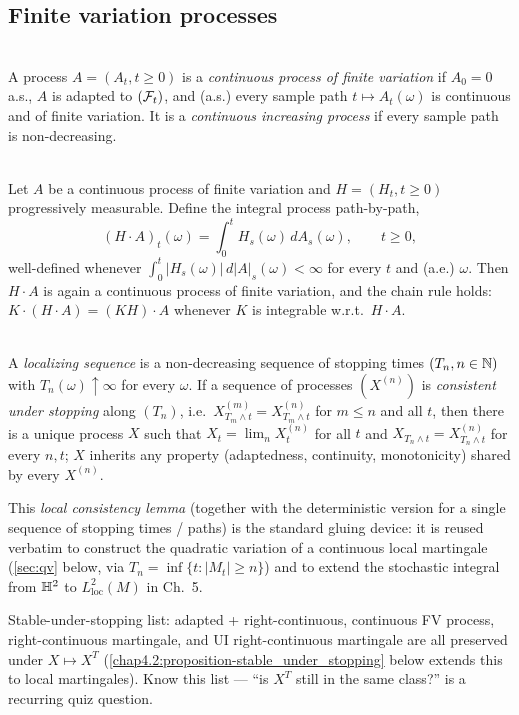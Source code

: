 \subsection{Finite variation processes}
\begin{definition} \label{chap4.1:definition-continuous_fv_process}  \\
A process $A=(A_t,t\ge0)$ is a \textit{continuous process of finite variation} if $A_0=0$ a.s., $A$ is adapted to $(\mathcal{F}_t)$, and (a.s.) every sample path $t\mapsto A_t(\omega)$ is continuous and of finite variation. It is a \textit{continuous increasing process} if every sample path is non-decreasing.
\end{definition}

\begin{proposition} \label{chap4.1:proposition-integral_process}  \\
Let $A$ be a continuous process of finite variation and $H=(H_t,t\ge0)$ progressively measurable. Define the integral process path-by-path,
$$(H\cdot A)_t(\omega)=\int_0^t H_s(\omega)\,dA_s(\omega), \qquad t\ge0,$$
well-defined whenever $\int_0^t|H_s(\omega)|\,d|A|_s(\omega)<\infty$ for every $t$ and (a.e.) $\omega$. Then $H\cdot A$ is again a continuous process of finite variation, and the chain rule holds: $K\cdot(H\cdot A)=(KH)\cdot A$ whenever $K$ is integrable w.r.t.\ $H\cdot A$.
\end{proposition}

\begin{definition} \label{chap4.1:definition-localizing_sequence}  \\
A \textit{localizing sequence} is a non-decreasing sequence of stopping times $(T_n,n\in\mathbb{N})$ with $T_n(\omega)\uparrow\infty$ for every $\omega$. If a sequence of processes $(X^{(n)})$ is \textit{consistent under stopping} along $(T_n)$, i.e.\ $X^{(m)}_{T_m\wedge t}=X^{(n)}_{T_m\wedge t}$ for $m\le n$ and all $t$, then there is a unique process $X$ such that $X_t=\lim_n X_t^{(n)}$ for all $t$ and $X_{T_n\wedge t}=X^{(n)}_{T_n\wedge t}$ for every $n,t$; $X$ inherits any property (adaptedness, continuity, monotonicity) shared by every $X^{(n)}$.
\end{definition}
\begin{usedin} This \textit{local consistency lemma} (together with the deterministic version for a single sequence of stopping times / paths) is the standard gluing device: it is reused verbatim to construct the quadratic variation of a continuous local martingale (\cref{sec:qv} below, via $T_n=\inf\{t:|M_t|\ge n\}$) and to extend the stochastic integral from $\mathbb{H}^2$ to $L^2_{\mathrm{loc}}(M)$ in Ch.\ 5. \end{usedin}
\begin{quizbox} Stable-under-stopping list: adapted + right-continuous, continuous FV process, right-continuous martingale, and UI right-continuous martingale are all preserved under $X\mapsto X^T$ (\cref{chap4.2:proposition-stable_under_stopping} below extends this to local martingales). Know this list --- ``is $X^T$ still in the same class?'' is a recurring quiz question. \end{quizbox}

